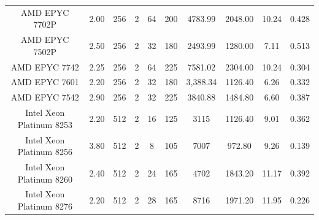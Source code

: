 \begin{table}[H]
\begin{adjustwidth}{-1.0in}{-1.0in}
\begin{center}
{\begin{tabular}{c||c|c|c|c|c|c|c|c|c}
\rowcolor[HTML]{EFEFEF} 
AMD EPYC 7702P            & 2.00       & 256                                                       & 2                                                        & 64    & 200   & 4783.99    & 2048.00       & 10.24       & 0.428         \\
AMD EPYC 7502P            & 2.50       & 256                                                       & 2                                                        & 32    & 180   & 2493.99    & 1280.00       & 7.11        & 0.513         \\
\rowcolor[HTML]{EFEFEF} 
AMD EPYC 7742             & 2.25       & 256                                                       & 2                                                        & 64    & 225   & 7581.02    & 2304.00       & 10.24       & 0.304         \\
AMD EPYC 7601             & 2.20       & 256                                                       & 2                                                        & 32    & 180   & 3,388.34   & 1126.40       & 6.26        & 0.332         \\
\rowcolor[HTML]{EFEFEF} 
AMD EPYC 7542             & 2.90       & 256                                                       & 2                                                        & 32    & 225   & 3840.88    & 1484.80       & 6.60        & 0.387         \\ \hline
Intel Xeon Platinum 8253  & 2.20       & 512                                                       & 2                                                        & 16    & 125   & 3115       & 1126.40       & 9.01        & 0.362         \\
\rowcolor[HTML]{EFEFEF} 
Intel Xeon Platinum 8256  & 3.80       & 512                                                       & 2                                                        & 8     & 105   & 7007       & 972.80        & 9.26        & 0.139         \\
Intel Xeon Platinum 8260  & 2.40       & 512                                                       & 2                                                        & 24    & 165   & 4702       & 1843.20       & 11.17       & 0.392         \\
\rowcolor[HTML]{EFEFEF} 
Intel Xeon Platinum 8276  & 2.20       & 512                                                       & 2                                                        & 28    & 165   & 8716       & 1971.20       & 11.95       & 0.226         \\

\end{tabular}}
\end{center}
\end{adjustwidth}
\end{table}
